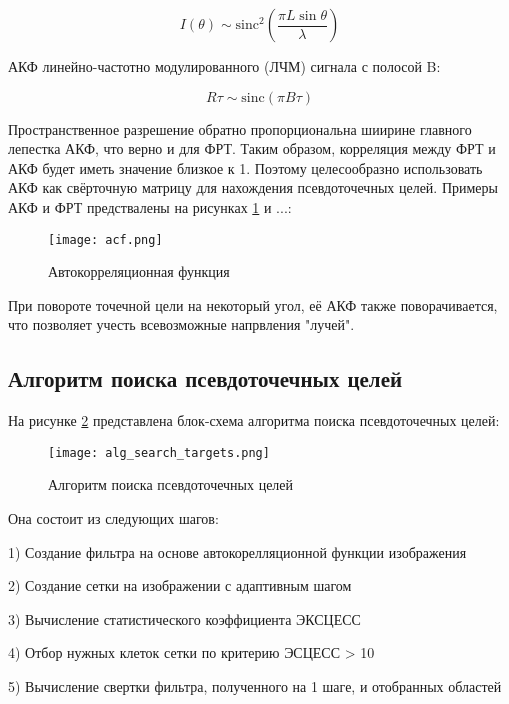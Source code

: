 \begin{equation}
    I(\theta) \sim \text{sinc}^2\left(\frac{\pi L \sin\theta}{\lambda}\right)
\end{equation}

	АКФ линейно-частотно модулированного (ЛЧМ) сигнала с полосой B:
	
\begin{equation}
    R{\tau} \sim \text{sinc}(\pi B \tau)
\end{equation}

	Пространственное разрешение обратно пропорциональна шиирине главного лепестка АКФ, что верно и для ФРТ. Таким образом, корреляция между ФРТ и АКФ будет иметь значение близкое к 1. Поэтому целесообразно использовать АКФ как свёрточную матрицу для нахождения псевдоточечных целей. Примеры АКФ и ФРТ предствалены на рисунках \ref{fig:acf} и ...:
	

\begin{figure}[ht]
    \centering
    \texttt{[image: acf.png]}
    \caption{Автокорреляционная функция}
    \label{fig:acf}
\end{figure}


	При повороте точечной цели на некоторый угол, её АКФ также поворачивается, что позволяет учесть всевозможные напрвления "лучей". 	

\subsection{Алгоритм поиска псевдоточечных целей}

	На рисунке \ref{fig:alg_search_targets} представлена блок-схема алгоритма поиска псевдоточечных целей:

\begin{figure}[ht]
    \centering
    \texttt{[image: alg\_search\_targets.png]}
    \caption{Алгоритм поиска псевдоточечных целей}
    \label{fig:alg_search_targets}
\end{figure}

Она состоит из следующих шагов:

	1) Создание фильтра на основе автокорелляционной функции изображения
	
	2) Создание сетки на изображении с адаптивным шагом
	
	3) Вычисление статистического коэффициента ЭКСЦЕСС
	
	4) Отбор нужных клеток сетки по критерию ЭСЦЕСС > 10
	
	5) Вычисление свертки фильтра, полученного на 1 шаге, и отобранных областей
	
